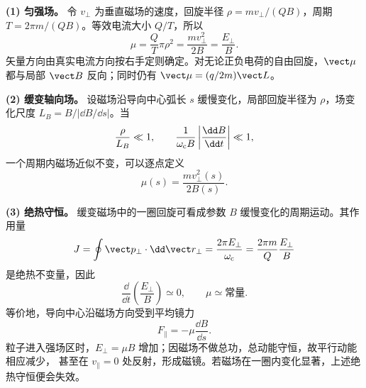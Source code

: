 \begin{xesolution}
\textbf{(1) 匀强场。}
令 $v_\perp$ 为垂直磁场的速度，回旋半径 $\rho=mv_\perp/(Q B)$，周期
$T=2\pi m/(QB)$。等效电流大小 $Q/T$，所以
\begin{equation}
  \boxed{\mu=\frac{Q}{T}\pi\rho^2
  =\frac{mv_\perp^2}{2B}=\frac{E_\perp}{B}}.
\end{equation}
矢量方向由真实电流方向按右手定则确定。对无论正负电荷的自由回旋，$\vect\mu$ 都与局部
$\vect B$ 反向；同时仍有 $\vect\mu=(q/2m)\vect L$。

\textbf{(2) 缓变轴向场。}
设磁场沿导向中心弧长 $s$ 缓慢变化，局部回旋半径为 $\rho$，场变化尺度
$L_B=B/|\dd B/\dd s|$。当
\begin{equation}
  \frac{\rho}{L_B}\ll1,
  \qquad
  \frac1{\omega_{\rm c}B}\left|\frac{\dd B}{\dd t}\right|\ll1,
\end{equation}
一个周期内磁场近似不变，可以逐点定义
\begin{equation}
  \boxed{\mu(s)=\frac{mv_\perp^2(s)}{2B(s)}}.
\end{equation}

\textbf{(3) 绝热守恒。}
缓变磁场中的一圈回旋可看成参数 $B$ 缓慢变化的周期运动。其作用量
\begin{equation}
  J=\oint\vect p_\perp\cdot\dd\vect r_\perp
  =\frac{2\pi E_\perp}{\omega_{\rm c}}
  =\frac{2\pi m}{Q}\frac{E_\perp}{B}
\end{equation}
是绝热不变量，因此
\begin{equation}
  \boxed{\frac{\dd}{\dd t}\left(\frac{E_\perp}{B}\right)\simeq0},
  \qquad \boxed{\mu\simeq\text{常量}}.
\end{equation}
等价地，导向中心沿磁场方向受到平均镜力
\begin{equation}
  F_\parallel=-\mu\frac{\dd B}{\dd s}.
\end{equation}
粒子进入强场区时，$E_\perp=\mu B$ 增加；因磁场不做总功，总动能守恒，故平行动能相应减少，
甚至在 $v_\parallel=0$ 处反射，形成磁镜。若磁场在一圈内变化显著，上述绝热守恒便会失效。

\magneticMomentDiagram
\end{xesolution}
